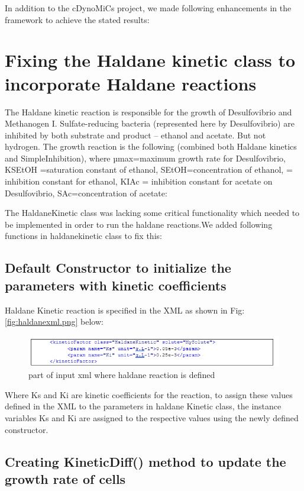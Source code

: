 In addition to the cDynoMiCs project, we made following enhancements in the framework to achieve the stated results:

\section{Fixing the Haldane kinetic class to incorporate Haldane reactions}

The Haldane kinetic reaction is responsible for the growth of Desulfovibrio and Methanogen I. Sulfate-reducing bacteria (represented here by Desulfovibrio) are inhibited by both substrate and product – ethanol and acetate. But not hydrogen. The growth reaction is the following (combined both Haldane kinetics and SimpleInhibition), where µmax=maximum growth rate for Desulfovibrio, KSEtOH =saturation constant of ethanol, SEtOH=concentration of ethanol,   = inhibition constant for ethanol, KIAc = inhibition constant for acetate on Desulfovibrio, SAc=concentration of acetate:

The HaldaneKinetic class was lacking some critical functionality which needed to be implemented in order to run the haldane reactions.We added following functions in haldanekinetic class to fix this:

\subsection{Default Constructor to initialize the parameters with kinetic coefficients}

Haldane Kinetic reaction is specified in the XML as shown in Fig:\ref{fig:haldanexml.png} below:

\begin{figure}[htbp]
\centering
\includegraphics[width=1.0\textwidth]{images/haldanexml.png}
\caption{part of input xml where haldane reaction is defined}
\label{fig:haldanexml}
\end{figure}

Where Ks and Ki are kinetic coefficients for the reaction, to assign these values defined in the XML to the parameters in haldane Kinetic class, the instance variables Ks and Ki are assigned to the respective values using the newly defined constructor.

\subsection{Creating KineticDiff() method to update the growth rate of cells}

